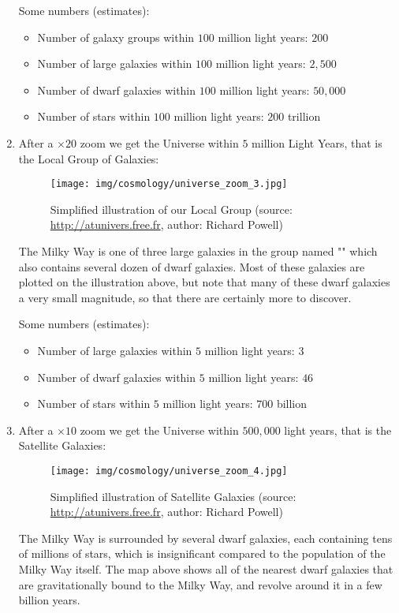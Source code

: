 \begin{enumerate}
		Some numbers (estimates):
		\begin{itemize}
			\item Number of galaxy groups within $100$ million light years: $200$
			\item Number of large galaxies within $100$ million light years: $2,500$
			\item Number of dwarf galaxies within $100$ million light years: $50,000$
			\item Number of stars within $100$ million light years: $200$ trillion
		\end{itemize}
		
		\item After a $\times 20$ zoom we get the Universe within $5$ million Light Years, that is the Local Group of Galaxies:
		\begin{figure}[H]
			\centering
			\texttt{[image: img/cosmology/universe\_zoom\_3.jpg]}
			\caption[Simplified illustration of our Local Group]{Simplified illustration of our Local Group (source: \url{http://atunivers.free.fr}, author: Richard Powell)}
		\end{figure}
		The Milky Way is one of three large galaxies in the group named "" which also contains several dozen of dwarf galaxies. Most of these galaxies are plotted on the illustration above, but note that many of these dwarf galaxies a very small magnitude, so that there are certainly more to discover.	
		
		Some numbers (estimates):
		\begin{itemize}
			\item Number of large galaxies within $5$ million light years: $3$
			\item Number of dwarf galaxies within $5$ million light years: $46$
			\item Number of stars within $5$ million light years: $700$ billion
		\end{itemize}
		
		\item After a $\times 10$ zoom we get the Universe within $500,000$ light years, that is the Satellite Galaxies:
		\begin{figure}[H]
			\centering
			\texttt{[image: img/cosmology/universe\_zoom\_4.jpg]}
			\caption[Simplified illustration of Satellite Galaxies]{Simplified illustration of Satellite Galaxies (source: \url{http://atunivers.free.fr}, author: Richard Powell)}
		\end{figure}
		The Milky Way is surrounded by several dwarf galaxies, each containing tens of millions of stars, which is insignificant compared to the population of the Milky Way itself. The map above shows all of the nearest dwarf galaxies that are gravitationally bound to the Milky Way, and revolve around it in a few billion years.
		

\end{enumerate}
